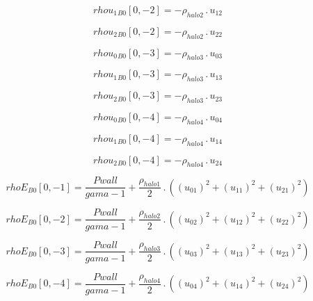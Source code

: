 \documentclass{article}
\begin{document}
\begin{dmath}{rhou_{1}{_{B0}}}[{0,-2}] = - \rho_{halo 2} \,.\, u_{12}\end{dmath}

\begin{dmath}{rhou_{2}{_{B0}}}[{0,-2}] = - \rho_{halo 2} \,.\, u_{22}\end{dmath}

\begin{dmath}{rhou_{0}{_{B0}}}[{0,-3}] = - \rho_{halo 3} \,.\, u_{03}\end{dmath}

\begin{dmath}{rhou_{1}{_{B0}}}[{0,-3}] = - \rho_{halo 3} \,.\, u_{13}\end{dmath}

\begin{dmath}{rhou_{2}{_{B0}}}[{0,-3}] = - \rho_{halo 3} \,.\, u_{23}\end{dmath}

\begin{dmath}{rhou_{0}{_{B0}}}[{0,-4}] = - \rho_{halo 4} \,.\, u_{04}\end{dmath}

\begin{dmath}{rhou_{1}{_{B0}}}[{0,-4}] = - \rho_{halo 4} \,.\, u_{14}\end{dmath}

\begin{dmath}{rhou_{2}{_{B0}}}[{0,-4}] = - \rho_{halo 4} \,.\, u_{24}\end{dmath}

\begin{dmath}{rhoE{_{B0}}}[{0,-1}] = \frac{Pwall}{gama - 1} + \frac{\rho_{halo 1}}{2} \,.\, \left(\left(u_{01} \right)^{2} + \left(u_{11} \right)^{2} + \left(u_{21} \right)^{2}\right)\end{dmath}

\begin{dmath}{rhoE{_{B0}}}[{0,-2}] = \frac{Pwall}{gama - 1} + \frac{\rho_{halo 2}}{2} \,.\, \left(\left(u_{02} \right)^{2} + \left(u_{12} \right)^{2} + \left(u_{22} \right)^{2}\right)\end{dmath}

\begin{dmath}{rhoE{_{B0}}}[{0,-3}] = \frac{Pwall}{gama - 1} + \frac{\rho_{halo 3}}{2} \,.\, \left(\left(u_{03} \right)^{2} + \left(u_{13} \right)^{2} + \left(u_{23} \right)^{2}\right)\end{dmath}

\begin{dmath}{rhoE{_{B0}}}[{0,-4}] = \frac{Pwall}{gama - 1} + \frac{\rho_{halo 4}}{2} \,.\, \left(\left(u_{04} \right)^{2} + \left(u_{14} \right)^{2} + \left(u_{24} \right)^{2}\right)\end{dmath}
\end{document}
